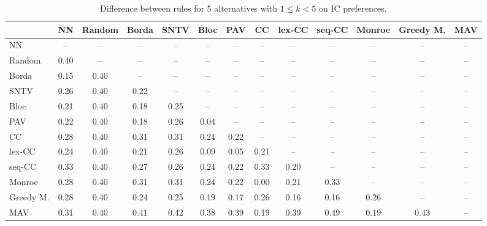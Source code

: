 
\begin{table*}[htbp]
\centering
\begin{tabular}{lcccccccccccc}
\toprule
 & NN & Random & Borda & SNTV & Bloc & PAV & CC & lex-CC & seq-CC & Monroe & Greedy M. & MAV \\
\midrule
NN & -- & -- & -- & -- & -- & -- & -- & -- & -- & -- & -- & -- \\
Random & \cellcolor{blue!40} 0.40 & -- & -- & -- & -- & -- & -- & -- & -- & -- & -- & -- \\
Borda & \cellcolor{blue!15} 0.15 & \cellcolor{blue!40} 0.40 & -- & -- & -- & -- & -- & -- & -- & -- & -- & -- \\
SNTV & \cellcolor{blue!26} 0.26 & \cellcolor{blue!40} 0.40 & \cellcolor{blue!22} 0.22 & -- & -- & -- & -- & -- & -- & -- & -- & -- \\
Bloc & \cellcolor{blue!21} 0.21 & \cellcolor{blue!40} 0.40 & \cellcolor{blue!18} 0.18 & \cellcolor{blue!25} 0.25 & -- & -- & -- & -- & -- & -- & -- & -- \\
PAV & \cellcolor{blue!22} 0.22 & \cellcolor{blue!40} 0.40 & \cellcolor{blue!18} 0.18 & \cellcolor{blue!26} 0.26 & \cellcolor{blue!4} 0.04 & -- & -- & -- & -- & -- & -- & -- \\
CC & \cellcolor{blue!28} 0.28 & \cellcolor{blue!40} 0.40 & \cellcolor{blue!31} 0.31 & \cellcolor{blue!31} 0.31 & \cellcolor{blue!24} 0.24 & \cellcolor{blue!22} 0.22 & -- & -- & -- & -- & -- & -- \\
lex-CC & \cellcolor{blue!24} 0.24 & \cellcolor{blue!40} 0.40 & \cellcolor{blue!21} 0.21 & \cellcolor{blue!26} 0.26 & \cellcolor{blue!9} 0.09 & \cellcolor{blue!5} 0.05 & \cellcolor{blue!21} 0.21 & -- & -- & -- & -- & -- \\
seq-CC & \cellcolor{blue!33} 0.33 & \cellcolor{blue!40} 0.40 & \cellcolor{blue!27} 0.27 & \cellcolor{blue!26} 0.26 & \cellcolor{blue!24} 0.24 & \cellcolor{blue!22} 0.22 & \cellcolor{blue!33} 0.33 & \cellcolor{blue!20} 0.20 & -- & -- & -- & -- \\
Monroe & \cellcolor{blue!28} 0.28 & \cellcolor{blue!40} 0.40 & \cellcolor{blue!31} 0.31 & \cellcolor{blue!31} 0.31 & \cellcolor{blue!24} 0.24 & \cellcolor{blue!22} 0.22 & \cellcolor{blue!0} 0.00 & \cellcolor{blue!21} 0.21 & \cellcolor{blue!33} 0.33 & -- & -- & -- \\
Greedy M. & \cellcolor{blue!28} 0.28 & \cellcolor{blue!40} 0.40 & \cellcolor{blue!24} 0.24 & \cellcolor{blue!25} 0.25 & \cellcolor{blue!19} 0.19 & \cellcolor{blue!17} 0.17 & \cellcolor{blue!26} 0.26 & \cellcolor{blue!16} 0.16 & \cellcolor{blue!16} 0.16 & \cellcolor{blue!26} 0.26 & -- & -- \\
MAV & \cellcolor{blue!31} 0.31 & \cellcolor{blue!40} 0.40 & \cellcolor{blue!41} 0.41 & \cellcolor{blue!42} 0.42 & \cellcolor{blue!38} 0.38 & \cellcolor{blue!39} 0.39 & \cellcolor{blue!19} 0.19 & \cellcolor{blue!39} 0.39 & \cellcolor{blue!49} 0.49 & \cellcolor{blue!19} 0.19 & \cellcolor{blue!43} 0.43 & -- \\
\bottomrule
\end{tabular}

\caption{Difference between rules for 5 alternatives with $1 \leq k < 5$ on IC preferences.}
\label{tab:rule_distance_heatmap-m=[5]-pref_dist=IC}
\end{table*}
    